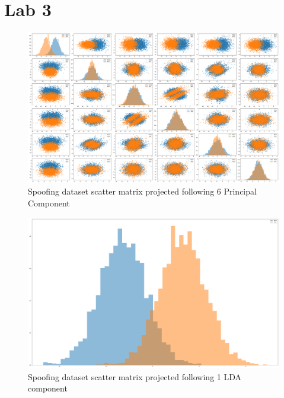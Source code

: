 \section{Lab 3}



\begin{figure}[htbp]
    \centering
    \includegraphics[width=0.9\linewidth]{lab03/PCA_6_scatter_matrix.png} %
    \caption{Spoofing dataset scatter matrix projected following 6 Principal Component}
    \label{fig:PCA_6_scatter}
\end{figure}

\begin{figure}[htbp]
    \centering
    \includegraphics[width=0.9\linewidth]{lab03/LDA_1_scatter_matrix.png} %
    \caption{Spoofing dataset scatter matrix projected following 1 LDA component}
    \label{fig:LDA_1_scatter}
\end{figure}